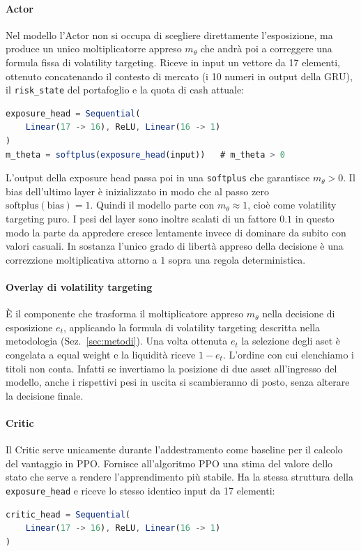 \paragraph{Actor}
Nel modello l'Actor non si occupa di scegliere direttamente l'esposizione, ma produce un unico moltiplicatorre appreso $m_\theta$ che andrà poi a correggere una formula fissa di volatility targeting. 
Riceve in input un vettore da 17 elementi, ottenuto concatenando il contesto di mercato (i 10 numeri in output della GRU), il \lstinline{risk_state} del portafoglio e la quota di cash attuale:

\begin{lstlisting}[language=Typescript, caption={Struttura della testa di esposizione}]
exposure_head = Sequential(
    Linear(17 -> 16), ReLU, Linear(16 -> 1)
)
m_theta = softplus(exposure_head(input))   # m_theta > 0
\end{lstlisting}

L'output della exposure head passa poi in una \lstinline{softplus} che garantisce $m_\theta > 0$.
Il bias dell'ultimo layer è inizializzato in modo che al passo zero $\text{softplus}(\text{bias})=1$. 
Quindi il modello parte con $m_\theta \approx 1$, cioè come volatility targeting puro. I pesi del layer sono inoltre scalati di un fattore $0.1$ in questo modo la parte da appredere cresce lentamente invece di dominare da subito con valori casuali. In sostanza l'unico grado di libertà appreso della decisione è una correzzione moltiplicativa attorno a $1$ sopra una regola deterministica.

\paragraph{Overlay di volatility targeting}
È il componente che trasforma il moltiplicatore appreso $m_\theta$ nella decisione di esposizione $e_t$, applicando la formula di volatility targeting descritta nella metodologia (Sez.~\ref{sec:metodi}). 
Una volta ottenuta $e_t$ la selezione degli aset è congelata a equal weight e la liquidità riceve $1- e_t$.
L'ordine con cui elenchiamo i titoli non conta. Infatti se invertiamo la posizione di due asset all'ingresso del modello, anche i rispettivi pesi in uscita si scambieranno di posto, senza alterare la decisione finale.

\paragraph{Critic}
Il Critic serve unicamente durante l'addestramento come baseline per il calcolo del vantaggio in PPO.
Fornisce all'algoritmo PPO una stima del valore dello stato che serve a rendere l'apprendimento più stabile. 
Ha la stessa struttura della \lstinline{exposure_head} e riceve lo stesso identico input da 17 elementi:
\begin{lstlisting}[language=Typescript, caption={Struttura del critic}]
critic_head = Sequential(
    Linear(17 -> 16), ReLU, Linear(16 -> 1)
)
\end{lstlisting}

